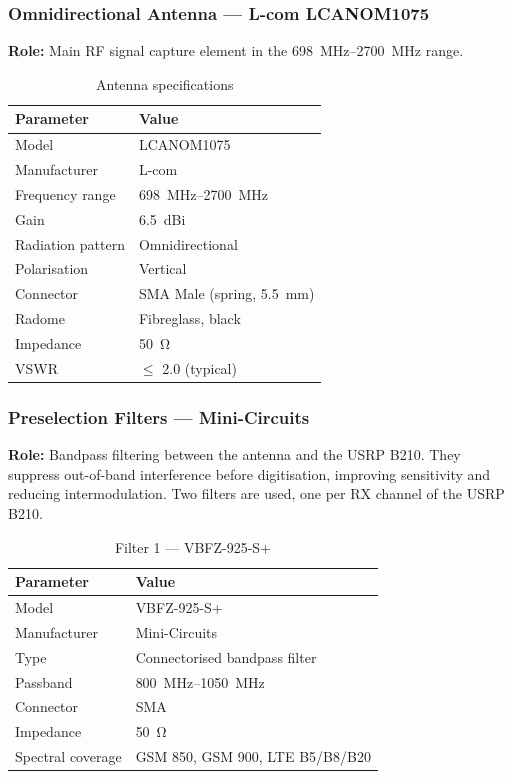 \documentclass[12pt,a4paper]{article}
\begin{document}
\subsubsection{Omnidirectional Antenna --- L-com LCANOM1075}

\textbf{Role:} Main RF signal capture element in the \qtyrange{698}{2700}{\MHz} range.

\begin{table}[H]
\centering
\caption{Antenna specifications}
\begin{tabular}{@{}ll@{}}
\toprule
\textbf{Parameter} & \textbf{Value} \\
\midrule
Model & LCANOM1075 \\
Manufacturer & L-com \\
Frequency range & \qtyrange{698}{2700}{\MHz} \\
Gain & 6.5~dBi \\
Radiation pattern & Omnidirectional \\
Polarisation & Vertical \\
Connector & SMA Male (spring, \qty{5.5}{\mm}) \\
Radome & Fibreglass, black \\
Impedance & \qty{50}{\ohm} \\
VSWR & $\leq$ 2.0 (typical) \\
\bottomrule
\end{tabular}
\end{table}

\subsubsection{Preselection Filters --- Mini-Circuits}

\textbf{Role:} Bandpass filtering between the antenna and the USRP B210. They suppress out-of-band interference before digitisation, improving sensitivity and reducing intermodulation. Two filters are used, one per RX channel of the USRP B210.

\begin{table}[H]
\centering
\caption{Filter 1 --- VBFZ-925-S+}
\begin{tabular}{@{}ll@{}}
\toprule
\textbf{Parameter} & \textbf{Value} \\
\midrule
Model & VBFZ-925-S+ \\
Manufacturer & Mini-Circuits \\
Type & Connectorised bandpass filter \\
Passband & \qtyrange{800}{1050}{\MHz} \\
Connector & SMA \\
Impedance & \qty{50}{\ohm} \\
Spectral coverage & GSM 850, GSM 900, LTE B5/B8/B20 \\
\bottomrule
\end{tabular}
\end{table}
\end{document}
